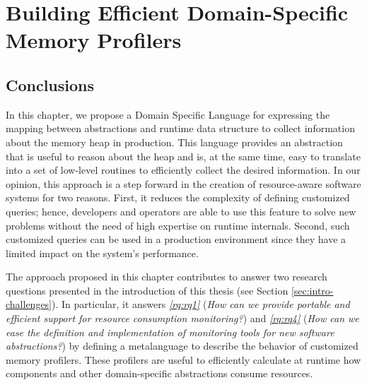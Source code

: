 \chapter{Building Efficient Domain-Specific Memory Profilers}
\label{chp:dsl-memory}














\section{Conclusions}\label{sec:conclusions}

In this chapter, we propose a Domain Specific Language for expressing the mapping between abstractions and runtime data structure to collect information about the memory heap in production.
This language provides an abstraction that is useful to reason about the heap and is, at the same time, easy to translate into a set of low-level routines to efficiently collect the desired information.
In our opinion, this approach is a step forward in the creation of resource-aware software systems for two reasons. 
First, it reduces the complexity of defining customized queries; hence, developers and operators are able to use this feature to solve new problems without the need of high expertise on runtime internals.
Second, such customized queries can be used in a production environment since they have a limited impact on the system's performance.

The approach proposed in this chapter contributes to answer two research questions presented in the introduction of this thesis (see Section \ref{sec:intro-challenges}).
In particular, it answers \textit{\ref{rq:rq1}} (\textit{How can we provide portable and efficient support for resource consumption monitoring?}) and \textit{\ref{rq:rq4}} (\textit{How can we ease the definition and implementation of monitoring tools for new software abstractions?}) by defining a metalanguage to describe the behavior of customized memory profilers.
These profilers are useful to efficiently calculate at runtime how components and other domain-specific abstractions consume resources. 
